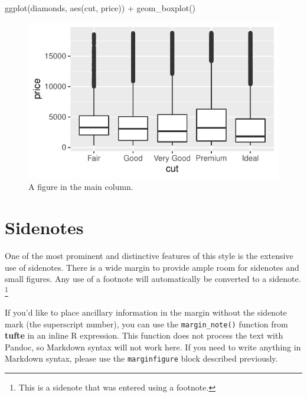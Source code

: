 \documentclass[]{tufte-handout}
\newenvironment{Shaded}{}{}
\newcommand{\FunctionTok}[1]{\textcolor[rgb]{0.02,0.16,0.49}{#1}}
\newcommand{\NormalTok}[1]{#1}
\newcommand{\SpecialCharTok}[1]{\textcolor[rgb]{0.25,0.44,0.63}{#1}}
\begin{document}
\begin{Shaded}
\begin{Highlighting}[]
\FunctionTok{ggplot}\NormalTok{(diamonds, }\FunctionTok{aes}\NormalTok{(cut, price)) }\SpecialCharTok{+} \FunctionTok{geom\_boxplot}\NormalTok{()}
\end{Highlighting}
\end{Shaded}

\begin{figure}
\includegraphics{tufte_files/figure-latex/fig-main-1} \caption[A figure in the main column]{A figure in the main column.}\label{fig:fig-main}
\end{figure}

\hypertarget{sidenotes}{%
\section{Sidenotes}\label{sidenotes}}

One of the most prominent and distinctive features of this style is the
extensive use of sidenotes. There is a wide margin to provide ample room
for sidenotes and small figures. Any use of a footnote will
automatically be converted to a sidenote. \footnote{This is a sidenote
  that was entered using a footnote.}

If you'd like to place ancillary information in the margin without the
sidenote mark (the superscript number), you can use the
\texttt{margin\_note()} function from \textbf{tufte} in an inline R
expression.
This function does not process the text with Pandoc, so Markdown syntax
will not work here. If you need to write anything in Markdown syntax,
please use the \texttt{marginfigure} block described previously.
\end{document}
